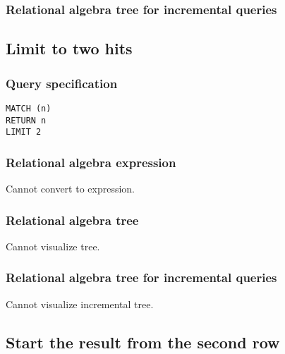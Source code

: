 \subsubsection*{Relational algebra tree for incremental queries}


\subsection{Limit to two hits}

\subsubsection*{Query specification}

\begin{lstlisting}
MATCH (n)
RETURN n
LIMIT 2
\end{lstlisting}

\subsubsection*{Relational algebra expression}

Cannot convert to expression.

\subsubsection*{Relational algebra tree}

Cannot visualize tree.

\subsubsection*{Relational algebra tree for incremental queries}

Cannot visualize incremental tree.

\subsection{Start the result from the second row}

